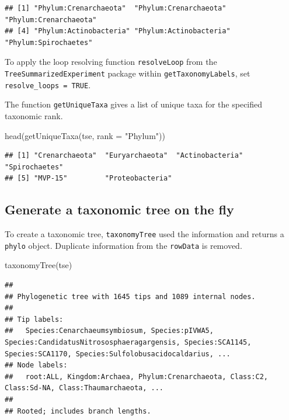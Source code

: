\documentclass[
]{book}
\newenvironment{Shaded}{\begin{snugshade}}{\end{snugshade}}
\newcommand{\AttributeTok}[1]{\textcolor[rgb]{0.77,0.63,0.00}{#1}}
\newcommand{\FunctionTok}[1]{\textcolor[rgb]{0.00,0.00,0.00}{#1}}
\newcommand{\NormalTok}[1]{#1}
\newcommand{\StringTok}[1]{\textcolor[rgb]{0.31,0.60,0.02}{#1}}
\begin{document}
\begin{verbatim}
## [1] "Phylum:Crenarchaeota"  "Phylum:Crenarchaeota"  "Phylum:Crenarchaeota" 
## [4] "Phylum:Actinobacteria" "Phylum:Actinobacteria" "Phylum:Spirochaetes"
\end{verbatim}

To apply the loop resolving function \texttt{resolveLoop} from the
\texttt{TreeSummarizedExperiment} package \citep{R-TreeSummarizedExperiment} within
\texttt{getTaxonomyLabels}, set \texttt{resolve\_loops\ =\ TRUE}.

The function \texttt{getUniqueTaxa} gives a list of unique taxa for the
specified taxonomic rank.

\begin{Shaded}
\begin{Highlighting}[]
\FunctionTok{head}\NormalTok{(}\FunctionTok{getUniqueTaxa}\NormalTok{(tse, }\AttributeTok{rank =} \StringTok{"Phylum"}\NormalTok{))}
\end{Highlighting}
\end{Shaded}

\begin{verbatim}
## [1] "Crenarchaeota"  "Euryarchaeota"  "Actinobacteria" "Spirochaetes"  
## [5] "MVP-15"         "Proteobacteria"
\end{verbatim}

\hypertarget{generate-a-taxonomic-tree-on-the-fly}{%
\subsection{Generate a taxonomic tree on the fly}\label{generate-a-taxonomic-tree-on-the-fly}}

To create a taxonomic tree, \texttt{taxonomyTree} used the information and returns a
\texttt{phylo} object. Duplicate information from the \texttt{rowData} is removed.

\begin{Shaded}
\begin{Highlighting}[]
\FunctionTok{taxonomyTree}\NormalTok{(tse)}
\end{Highlighting}
\end{Shaded}

\begin{verbatim}
## 
## Phylogenetic tree with 1645 tips and 1089 internal nodes.
## 
## Tip labels:
##   Species:Cenarchaeumsymbiosum, Species:pIVWA5, Species:CandidatusNitrososphaeragargensis, Species:SCA1145, Species:SCA1170, Species:Sulfolobusacidocaldarius, ...
## Node labels:
##   root:ALL, Kingdom:Archaea, Phylum:Crenarchaeota, Class:C2, Class:Sd-NA, Class:Thaumarchaeota, ...
## 
## Rooted; includes branch lengths.
\end{verbatim}
\end{document}
